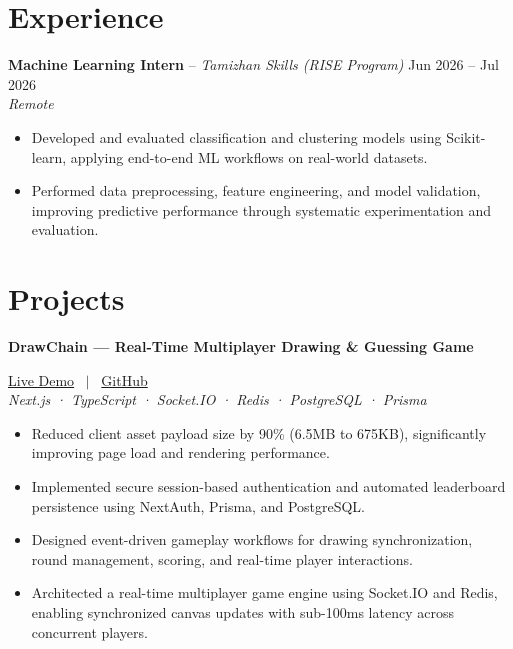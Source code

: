 \documentclass[10pt, a4paper]{article}
\begin{document}

\section{Experience}

\noindent \textbf{Machine Learning Intern} -- \textit{Tamizhan Skills (RISE Program)} \hfill Jun 2026 -- Jul 2026 \\
\textit{\small{Remote}} \\
\begin{itemize}

    \item Developed and evaluated classification and clustering models using Scikit-learn, applying end-to-end ML workflows on real-world datasets.

    \item Performed data preprocessing, feature engineering, and model validation, improving predictive performance through systematic experimentation and evaluation.

\end{itemize}
\vspace{2pt}



\section{Projects}

\noindent \textbf{DrawChain --- Real-Time Multiplayer Drawing \& Guessing Game} \hfill 

\small{
\href{https://drawchain.logiclane.online/}{Live Demo}
 \ $|$ \ \href{https://github.com/PankajKumar-11/DrawChain-}{GitHub}
}
 \\
\textit{\small{Next.js · TypeScript · Socket.IO · Redis · PostgreSQL · Prisma}}
\begin{itemize}

    \item Reduced client asset payload size by 90\% (6.5MB to 675KB), significantly improving page load and rendering performance.

    \item Implemented secure session-based authentication and automated leaderboard persistence using NextAuth, Prisma, and PostgreSQL.

    \item Designed event-driven gameplay workflows for drawing synchronization, round management, scoring, and real-time player interactions.

    \item Architected a real-time multiplayer game engine using Socket.IO and Redis, enabling synchronized canvas updates with sub-100ms latency across concurrent players.

\end{itemize}
\vspace{3pt}
\end{document}
